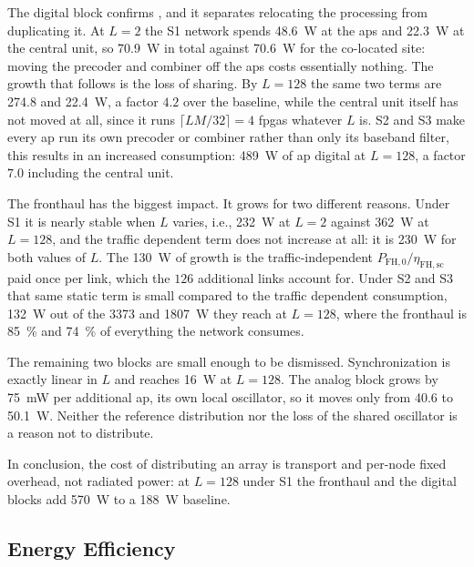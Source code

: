 The digital block confirms , and it separates relocating the
processing from duplicating it. At $L=2$ the S1 network spends
\SI{48.6}{\watt} at the \glspl{ap} and \SI{22.3}{\watt} at the central unit, so
\SI{70.9}{\watt} in total against \SI{70.6}{\watt} for the co-located site:
moving the precoder and combiner off the \glspl{ap} costs essentially nothing.
The growth that follows is the loss of sharing. By $L=128$ the same two terms
are \SI{274.8}{} and \SI{22.4}{\watt}, a factor $4.2$ over the baseline, while
the central unit itself has not moved at all, since it runs $\lceil
LM/32\rceil=4$ \glspl{fpga} whatever $L$ is. S2 and S3 make every \gls{ap} run
its own precoder or combiner rather than only its baseband filter, this results in an increased consumption: \SI{489}{\watt} of \gls{ap} digital at $L=128$, a factor $7.0$ including
the central unit.

The fronthaul has the biggest impact. It grows for two
different reasons. Under S1 it is nearly stable when $L$ varies, i.e., \SI{232}{\watt} at $L=2$ against \SI{362}{\watt} at $L=128$, and the traffic dependent term does not increase at all: it is \SI{230}{\watt} for both values of $L$. The \SI{130}{\watt} of growth is the
traffic-independent $P_{\mathrm{FH},0}/\eta_{\mathrm{FH,sc}}$ paid once per
link, which the $126$ additional links account for. Under S2 and S3 that
same static term is small compared to the traffic dependent consumption, \SI{132}{\watt} out of the \SI{3373}{} and \SI{1807}{\watt} they reach at $L=128$, where the fronthaul is
\SI{85}{\percent} and \SI{74}{\percent} of everything the network consumes.

The remaining two blocks are small enough to be dismissed. Synchronization is exactly linear in $L$ and reaches \SI{16}{\watt} at $L=128$. The analog block grows by \SI{75}{\milli\watt} per additional \gls{ap}, its own local oscillator, so it moves only from \SI{40.6}{} to
\SI{50.1}{\watt}. Neither the reference distribution nor the loss of the shared oscillator is a reason not to distribute.

In conclusion, the cost of distributing an array is
transport and per-node fixed overhead, not radiated power: at $L=128$ under S1
the fronthaul and the digital blocks add \SI{570}{\watt} to a \SI{188}{\watt}
baseline.

\subsection{Energy Efficiency}
\label{ssec:eval_ee}

